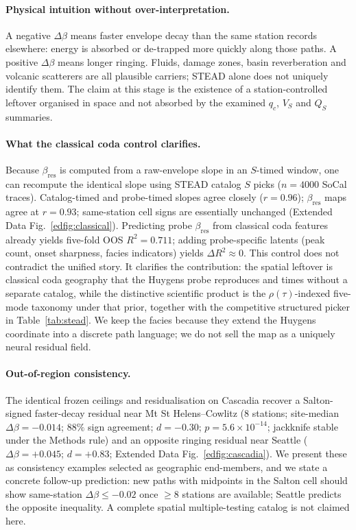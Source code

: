 \documentclass[twocolumn,10pt]{article}
\newcommand{\stead}{\textsc{STEAD}}
\begin{document}
\paragraph{Physical intuition without over-interpretation.}
A negative \(\Delta\beta\) means faster envelope decay than the same station
records elsewhere: energy is absorbed or de-trapped more quickly along those
paths. A positive \(\Delta\beta\) means longer ringing. Fluids, damage zones,
basin reverberation and volcanic scatterers are all plausible carriers; \stead{}
alone does not uniquely identify them. The claim at this stage is the existence
of a station-controlled leftover organised in space and not absorbed by the
examined \(q_c\), \(V_S\) and \(Q_S\) summaries.

\paragraph{What the classical coda control clarifies.}
Because \(\beta_{\mathrm{res}}\) is computed from a raw-envelope slope in an
\(S\)-timed window, one can recompute the identical slope using \stead{} catalog
\(S\) picks (\(n=4000\) SoCal traces). Catalog-timed and probe-timed slopes
agree closely (\(r=0.96\)); \(\beta_{\mathrm{res}}\) maps agree at \(r=0.93\);
same-station cell signs are essentially unchanged
(Extended Data Fig.~\ref{edfig:classical}). Predicting probe
\(\beta_{\mathrm{res}}\) from classical coda features already yields five-fold
OOS \(R^{2}=0.711\); adding probe-specific latents (peak count, onset sharpness,
facies indicators) yields \(\Delta R^{2}\approx0\). This control does not
contradict the unified story. It clarifies the contribution: the spatial
leftover is classical coda geography that the Huygens probe reproduces and
times without a separate catalog, while the distinctive scientific product is
the \(\rho(\tau)\)-indexed five-mode taxonomy under that prior, together with
the competitive structured picker in Table~\ref{tab:stead}. We keep the facies
because they extend the Huygens coordinate into a discrete path language; we do
not sell the map as a uniquely neural residual field.

\paragraph{Out-of-region consistency.}
The identical frozen ceilings and residualisation on Cascadia recover a
Salton-signed faster-decay residual near Mt St Helens--Cowlitz (\(8\) stations;
site-median \(\Delta\beta=-0.014\); \(88\%\) sign agreement; \(d=-0.30\);
\(p=5.6\times10^{-14}\); jackknife stable under the Methods rule) and an
opposite ringing residual near Seattle (\(\Delta\beta=+0.045\); \(d=+0.83\);
Extended Data Fig.~\ref{edfig:cascadia}). We present these as consistency
examples selected as geographic end-members, and we state a concrete follow-up
prediction: new paths with midpoints in the Salton cell should show same-station
\(\Delta\beta\le-0.02\) once \(\ge8\) stations are available; Seattle predicts
the opposite inequality. A complete spatial multiple-testing catalog is not
claimed here.
\end{document}
